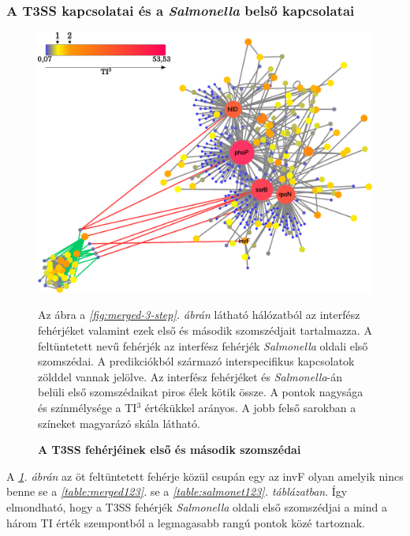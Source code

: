 \documentclass[a4paper,12pt]{article}
\newenvironment{imgdesc}{
		\small
		\singlespacing
		\begin{center}
		
	}{
		\end{center}	
	}
\begin{document}
		\subsubsection{A T3SS kapcsolatai és a \textit{Salmonella} belső kapcsolatai}
		
		\begin{figure}[H]
			\includegraphics[scale=0.6]{img/t3ss-inner-salmonella.pdf}
			\centering
			\caption{ \textbf{A T3SS fehérjéinek első és második szomszédai}}
			\begin{imgdesc}
				Az ábra a \textit{\ref{fig:merged-3-step}. ábrán} látható hálózatból az interfész fehérjéket valamint ezek első és második szomszédjait tartalmazza. A feltüntetett nevű fehérjék az interfész fehérjék \textit{Salmonella} oldali első szomszédai. A predikciókból származó interspecifikus kapcsolatok zölddel vannak jelölve. Az interfész fehérjéket és \textit{Salmonella}-án belüli első szomszédaikat piros élek kötik össze. A pontok nagysága és színmélysége a TI$^3$ értékükkel arányos. A jobb felső sarokban a színeket magyarázó skála látható.
			\end{imgdesc}
			\label{fig:t3ss_inner}			 		 
		\end{figure}

		A \textit{\ref{fig:t3ss_inner}. ábrán} az öt feltüntetett fehérje közül csupán egy az invF olyan amelyik nincs benne se a \textit{\ref{table:merged123}.} se a \textit{\ref{table:salmonet123}. táblázatban}. Így elmondható, hogy a T3SS fehérjék \textit{Salmonella} oldali első szomszédjai a mind a három TI érték szempontból a legmagasabb rangú pontok közé tartoznak.
\end{document}

